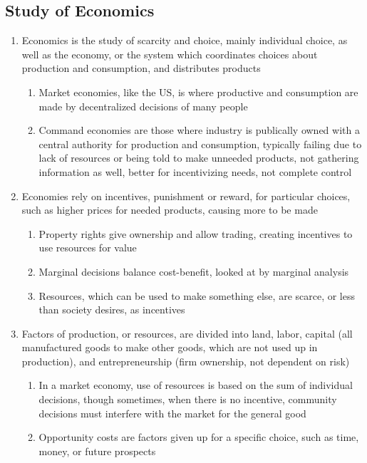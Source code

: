 \documentclass[11 pt, twoside]{article}
\begin{document}
\subsection{Study of Economics}
\begin{enumerate}
\item Economics is the study of scarcity and choice, mainly individual choice, as well as the economy, or the system
which coordinates choices about production and consumption, and distributes products
\begin{enumerate}
\item Market economies, like the US, is where productive and consumption are made by decentralized decisions of many
people
\item Command economies are those where industry is publically owned with a central authority for production and
consumption, typically failing due to lack of resources or being told to make unneeded products, not gathering
information as well, better for incentivizing needs, not complete control
\end{enumerate}
\item Economies rely on incentives, punishment or reward, for particular choices, such as higher prices for needed
products, causing more to be made
\begin{enumerate}
\item Property rights give ownership and allow trading, creating incentives to use resources for value
\item Marginal decisions balance cost{}-benefit, looked at by marginal analysis
\item Resources, which can be used to make something else, are scarce, or less than society desires, as incentives
\end{enumerate}
\item Factors of production, or resources, are divided into land, labor, capital (all manufactured goods to make other
goods, which are not used up in production), and entrepreneurship (firm ownership, not dependent on risk)
\begin{enumerate}
\item In a market economy, use of resources is based on the sum of individual decisions, though sometimes, when there is
no incentive, community decisions must interfere with the market for the general good
\item Opportunity costs are factors given up for a specific choice, such as time, money, or future prospects
\end{enumerate}

\end{enumerate}
\end{document}
